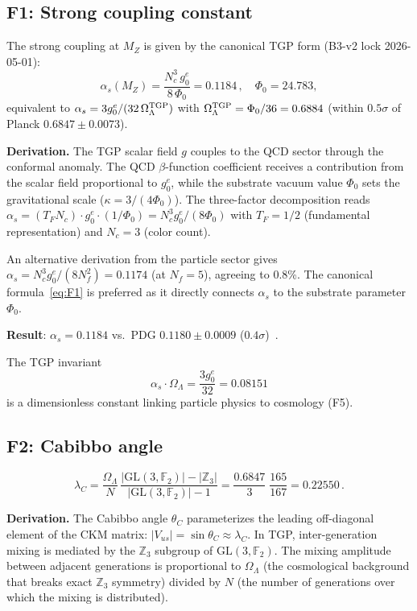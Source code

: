 \documentclass[aps,prd,twocolumn,superscriptaddress,showpacs,
  nofootinbib,floatfix,longbibliography]{revtex4-2}
\newcommand{\gone}{{g_0^e}}
\newcommand{\OL}{\Omega_\Lambda}
\newcommand{\GL}{\mathrm{GL}(3,\mathbb{F}_2)}
\newcommand{\as}{\alpha_s}
\newcommand{\PhiZero}{\Phi_0}
\newcommand{\MZ}{M_Z}
\newcommand{\ZZ}{\mathbb{Z}}
\begin{document}
\subsection{F1: Strong coupling constant}\label{ssec:F1}

The strong coupling at $\MZ$ is given by the canonical TGP form
(B3-v2 lock 2026-05-01):
\begin{equation}\label{eq:F1}
  \boxed{\as(\MZ) = \frac{N_c^3\,\gone}{8\,\PhiZero} = 0.1184}\,,
  \quad \PhiZero = 24.783,
\end{equation}
equivalent to $\as = 3\gone/(32\,\OL^{\rm TGP})$ with
$\OL^{\rm TGP} = \PhiZero/36 = 0.6884$ (within $0.5\sigma$ of
Planck $0.6847 \pm 0.0073$).

\textbf{Derivation.}
The TGP scalar field $g$ couples to the QCD sector through the
conformal anomaly. The QCD $\beta$-function coefficient receives a
contribution from the scalar field proportional to $\gone$,
while the substrate vacuum value $\PhiZero$ sets the gravitational
scale ($\kappa = 3/(4\PhiZero)$). The three-factor decomposition reads
$\as = (T_F N_c) \cdot \gone \cdot (1/\PhiZero) = N_c^3\gone/(8\PhiZero)$
with $T_F = 1/2$ (fundamental representation) and $N_c = 3$ (color count).

An alternative derivation from the particle sector gives
$\as = N_c^3 \gone / (8 N_f^2) = 0.1174$ (at $N_f = 5$), agreeing
to 0.8\%. The canonical formula~\eqref{eq:F1} is preferred as it
directly connects $\as$ to the substrate parameter $\PhiZero$.

\textbf{Result}: $\as = 0.1184$ vs.\ PDG $0.1180 \pm 0.0009$
($0.4\sigma$)~\cite{PDG2024}.

The TGP invariant
\begin{equation}\label{eq:F5}
  \as \cdot \OL = \frac{3\gone}{32} = 0.08151
\end{equation}
is a dimensionless constant linking particle physics to cosmology (F5).


\subsection{F2: Cabibbo angle}\label{ssec:F2}

\begin{equation}\label{eq:F2}
  \boxed{\lambda_C = \frac{\OL}{N}\,
  \frac{|\GL| - |\ZZ_3|}{|\GL| - 1}
  = \frac{0.6847}{3}\;\frac{165}{167}
  = 0.22550}\,.
\end{equation}

\textbf{Derivation.}
The Cabibbo angle $\theta_C$ parameterizes the leading off-diagonal
element of the CKM matrix: $|V_{us}| = \sin\theta_C \approx \lambda_C$.
In TGP, inter-generation mixing is mediated by the $\ZZ_3$ subgroup
of $\GL$. The mixing amplitude between adjacent generations is
proportional to $\OL$ (the cosmological background that breaks exact
$\ZZ_3$ symmetry) divided by $N$ (the number of generations over
which the mixing is distributed).
\end{document}
